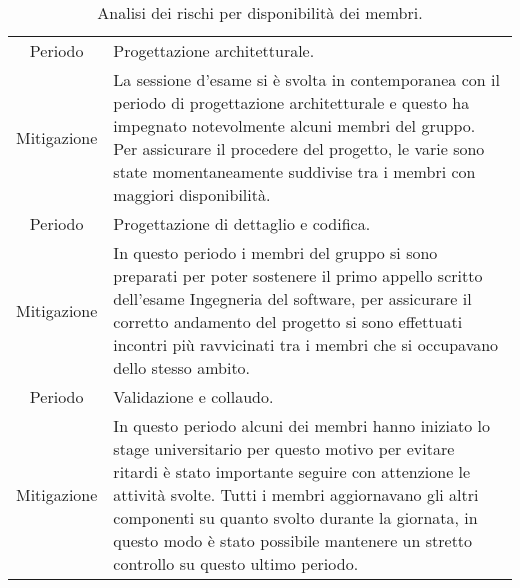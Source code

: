 \begin{table}[H]
	\centering
	\begin{tabular}{|c|p{11.5cm}|}
	\rowcolor{darkblue} \hline
	\multicolumn{2}{|c|}{\textcolor{white}{\textbf{RG2 - Disponibilità dei membri}}}\\ \hline
	Periodo & Progettazione architetturale.\\ \hline
	Mitigazione & La sessione d'esame si è svolta in contemporanea con il periodo di progettazione architetturale e questo ha impegnato notevolmente alcuni membri del gruppo. Per assicurare il procedere del progetto, le varie \glo{attività} sono state momentaneamente suddivise tra i membri con maggiori disponibilità.\\ \hline
	Periodo & Progettazione di dettaglio e codifica.\\ \hline
	Mitigazione & In questo periodo i membri del gruppo si sono preparati per poter sostenere il primo appello scritto dell'esame Ingegneria del software, per assicurare il corretto andamento del progetto si sono effettuati incontri più ravvicinati tra i membri che si occupavano dello stesso ambito.\\ \hline
	Periodo & Validazione e collaudo.\\ \hline
	Mitigazione & In questo periodo alcuni dei membri hanno iniziato lo stage universitario per questo motivo per evitare ritardi è stato importante seguire con attenzione le attività svolte. Tutti i membri aggiornavano gli altri componenti su quanto svolto durante la giornata, in questo modo è stato possibile mantenere un stretto controllo su questo ultimo periodo.\\ \hline
	\end{tabular}
	\caption{\label{tab:ARG2}Analisi dei rischi per disponibilità dei membri.}
\end{table}
